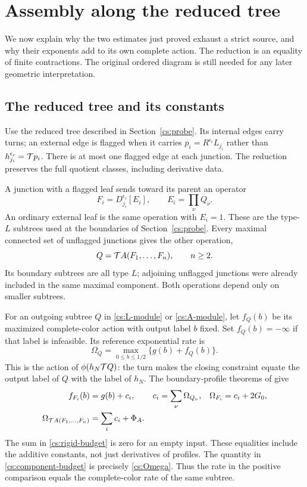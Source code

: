 \section{Assembly along the reduced tree}\label{cs:assembly}

We now explain why the two estimates just proved exhaust a strict
source, and why their exponents add to its own complete action.
The reduction is an equality of finite contractions. The original
ordered diagram is still needed for any later geometric interpretation.

\subsection{The reduced tree and its constants}

Use the reduced tree described in Section~\ref{cs:probe}. Its internal
edges carry turns; an external edge is flagged when it carries
$p_i=R^{\epsilon_i}L_{j_i}$ rather than $h_{j_i}^{\epsilon_i}=\mathcal T p_i$.
There is at most one flagged edge at each junction. The reduction
preserves the full quotient classes, including derivative data.

A junction with a flagged leaf sends toward its parent an operator
\begin{equation}\label{cs:L-module}
 F_i=D_{j_i}^{\epsilon_i}[E_i],\qquad E_i=\prod_\nu Q_\nu.
\end{equation}
An ordinary external leaf is the same operation with \(E_i=1\).
These are the type-\(L\) subtrees used at the boundaries of
Section~\ref{cs:probe}. Every maximal connected set of unflagged
junctions gives the other operation,
\begin{equation}\label{cs:A-module}
 Q=\mathcal T A(F_1,\ldots,F_n),\qquad n\ge2.
\end{equation}
Its boundary subtrees are all type \(L\); adjoining unflagged junctions
were already included in the same maximal component. Both operations
depend only on smaller subtrees.

For an outgoing subtree $Q$ in \eqref{cs:L-module} or \eqref{cs:A-module}, let $f_Q(b)$ be its maximized complete-color
action with output label $b$ fixed. Set $f_Q(b)=-\infty$ if that
label is infeasible. Its reference exponential rate is
\[
 \Omega_Q=\max_{0\le b\le1/2}\{g(b)+f_Q(b)\}.
\]
This is the action of $\phi(h_N\mathcal T Q)$: the turn makes the
closing constraint equate the output label of $Q$ with the label of
$h_N$. The boundary-profile theorems of \cite[Theorems 7.3--7.4 and
Corollary 7.5]{Newton} give
\begin{align}
 f_{F_i}(b)&=g(b)+c_i,
 &c_i&=\sum_\nu\Omega_{Q_\nu},
 &\Omega_{F_i}&=c_i+2G_0,\label{cs:rigid-budget}\\
 \Omega_{\mathcal T A(F_1,\ldots,F_n)}
     &=\sum_i c_i+\Phi_A.&&&&\label{cs:component-budget}
\end{align}
The sum in \eqref{cs:rigid-budget} is zero for an empty input.
These equalities include the additive constants, not just derivatives
of profiles. The quantity in \eqref{cs:component-budget} is precisely
\eqref{cs:Omega}. Thus the rate in the positive comparison equals the complete-color rate of the same subtree.

